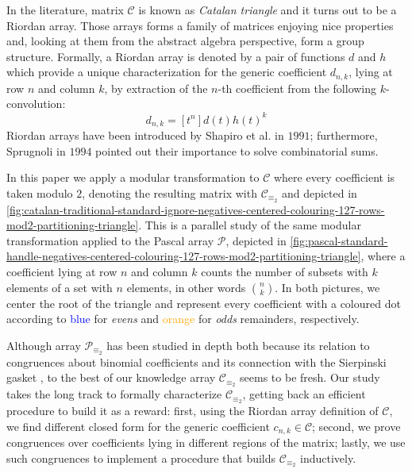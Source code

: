 In the literature, matrix $\mathcal{C}$ is known as \emph{Catalan triangle} and
it turns out to be a Riordan array. Those arrays forms a family of matrices enjoying
nice properties and, looking at them from the abstract algebra perspective, 
form a group structure. 
Formally, a Riordan array is denoted by a pair of functions $d$ and $h$ which provide a unique 
characterization for the generic coefficient $d_{n,k}$, lying at row $n$ and column $k$, 
by extraction of the $n$-th coefficient from the following $k$-convolution:
\begin{equation}
    d_{n,k} = [t^{n}]d(t)h(t)^{k}
    \label{eq:Riordan:array:coefficient}
\end{equation}
Riordan arrays have been introduced by Shapiro et al. \cite{shapiro:1991} in $1991$;
furthermore, Sprugnoli \cite{sprugnoli:1991} in $1994$ pointed out their importance
to solve combinatorial sums.

In this paper we apply a modular transformation to $\mathcal{C}$ where every coefficient 
is taken modulo $2$, denoting the resulting matrix with $\mathcal{C}_{\equiv_{2}}$ and
depicted in \autoref{fig:catalan-traditional-standard-ignore-negatives-centered-colouring-127-rows-mod2-partitioning-triangle}.
This is a parallel study of the same modular transformation applied to the Pascal array $\mathcal{P}$,
depicted in \autoref{fig:pascal-standard-handle-negatives-centered-colouring-127-rows-mod2-partitioning-triangle},
where a coefficient lying at row $n$ and column $k$ counts the number of subsets
with $k$ elements of a set with $n$ elements, in other words ${{n}\choose{k}}$.
In both pictures, we center the root of the triangle and represent every coefficient 
with a coloured dot according to \textcolor{blue}{blue} for \emph{evens} and \textcolor{orange}{orange} for \emph{odds} 
remainders, respectively. 

Although array $\mathcal{P}_{\equiv_{2}}$ has been studied in depth both because its 
relation to congruences about binomial coefficients and its connection with
the Sierpinski gasket \cite{stewart:four:encounters:sierpinski} \cite{sokolov},
to the best of our knowledge array $\mathcal{C}_{\equiv_{2}}$ seems to be fresh.  
Our study takes the long track to formally characterize $\mathcal{C}_{\equiv_{2}}$,
getting back an efficient procedure to build it as a reward: first,
using the Riordan array definition of $\mathcal{C}$, we find different closed form for
the generic coefficient $c_{n,k}\in\mathcal{C}$; second, we prove congruences over coefficients
lying in different regions of the matrix; lastly, we use such congruences to implement a procedure
that builds $\mathcal{C}_{\equiv_{2}}$ inductively. 

